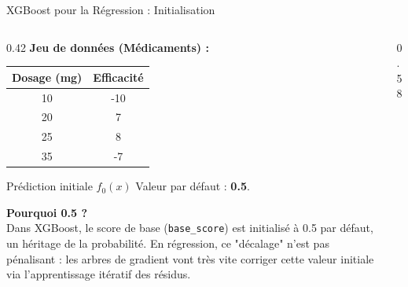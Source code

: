 \begin{frame}{XGBoost pour la Régression : Initialisation}
    \begin{columns}[T]
        \begin{column}{0.42\textwidth}
            \textbf{Jeu de données (Médicaments) :}
            
            \begin{table}
                \centering
                \scriptsize
                \begin{tabular}{|c|c|}
                    \hline
                    \textbf{Dosage (mg)} & \textbf{Efficacité} \\
                    \hline
                    10 & -10 \\
                    20 & 7 \\
                    25 & 8 \\
                    35 & -7 \\
                    \hline
                \end{tabular}
            \end{table}
            
            \begin{block}{Prédiction initiale $f_0(x)$}
                \scriptsize
                Valeur par défaut : \textbf{0.5}.
                
                \textbf{Pourquoi 0.5 ?} \\
                Dans XGBoost, le score de base (\texttt{base\_score}) est initialisé à 0.5 par défaut, un héritage de la probabilité. En régression, ce "décalage" n'est pas pénalisant : les arbres de gradient vont très vite corriger cette valeur initiale via l'apprentissage itératif des résidus.
            \end{block}
        \end{column}
        
        \begin{column}{0.58\textwidth}
            \begin{center}
\end{center}
\end{column}
\end{columns}
\end{frame}

